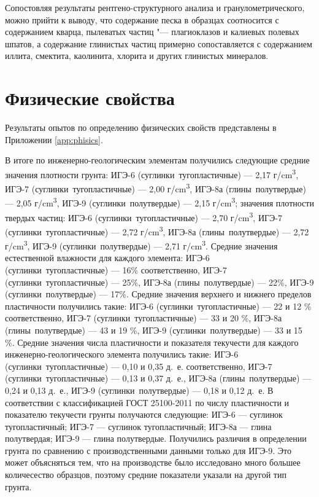 Сопостовляя результаты рентгено-структурного анализа и гранулометрического, 
можно прийти к выводу, что содержание песка в образцах соотносится с 
содержанием кварца, пылеватых частиц "--- плагиоклазов и калиевых
полевых шпатов, а содержание глинистых частиц примерно сопоставляется с 
содержанием иллита, смектита, каолинита, хлорита и других глинистых минералов.

\section{Физические свойства}

Результаты опытов по определению физических свойств представлены в 
Приложении \ref{app:phisics}. 

В итоге по инженерно-геологическим элементам получились следующие 
средние значения плотности грунта: 
ИГЭ-6 (суглинки тугопластичные) --- 2,17 г/\si{\centi\meter^3}, 
ИГЭ-7 (суглинки тугопластичные) --- 2,00 г/\si{\centi\meter^3}, 
ИГЭ-8а (глины полутвердые) --- 2,05 г/\si{\centi\meter^3}, 
ИГЭ-9 (суглинки полутвердые) --- 2,15 г/\si{\centi\meter^3}; 
значения плотности твердых частиц: 
ИГЭ-6 (суглинки тугопластичные) --- 2,70 г/\si{\centi\meter^3}, 
ИГЭ-7 (суглинки тугопластичные) --- 2,72 г/\si{\centi\meter^3}, 
ИГЭ-8а (глины полутвердые) --- 2,72 г/\si{\centi\meter^3}, 
ИГЭ-9 (суглинки полутвердые) --- 2,71 г/\si{\centi\meter^3}. 
Средние значения естественной влажности для каждого элемента:
ИГЭ-6 (суглинки тугопластичные) --- 16\% соответственно, 
ИГЭ-7 (суглинки тугопластичные) --- 25\%, 
ИГЭ-8а (глины полутвердые) --- 22\%, 
ИГЭ-9 (суглинки полутвердые) --- 17\%.
Средние значения верхнего и нижнего пределов пластичности 
получились такие: 
ИГЭ-6 (суглинки тугопластичные) --- 22 и 12 \% соответственно, 
ИГЭ-7 (суглинки тугопластичные) --- 33 и 20 \%, 
ИГЭ-8а (глины полутвердые) --- 43 и 19 \%, 
ИГЭ-9 (суглинки полутвердые) --- 33 и 15 \%.
Средние значения числа пластичности и показателя текучести 
для каждого инженерно-геологического элемента получились такие:
ИГЭ-6 (суглинки тугопластичные) --- 0,10 и 0,35 д.~е. соответственно, 
ИГЭ-7 (суглинки тугопластичные) --- 0,13 и 0,37 д.~е., 
ИГЭ-8а (глины полутвердые) --- 0,24 и 0,13 д.~е., 
ИГЭ-9 (суглинки полутвердые) --- 0,18 и 0,12 д.~е.
В соответствии с классификацией ГОСТ 25100-2011 
по числу пластичности и показателю текучести 
грунты получаются следующие:
ИГЭ-6 --- суглинок тугопластичный;
ИГЭ-7 --- суглинок тугопластичный;
ИГЭ-8а --- глина полутвердая;
ИГЭ-9 --- глина полутвердые.
Получились различия в определении грунта по сравнению 
с производственными данными только для 
ИГЭ-9. Это может объясняться тем, что на производстве 
было исследовано много большее количесество образцов, 
поэтому средние показатели указали на другой 
тип грунта.

